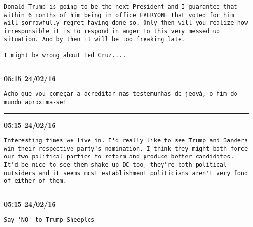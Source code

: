 \begin{adjustwidth}{0cm}{0cm}
\begin{lstlisting}[breaklines, breakatwhitespace, basicstyle=\small, frame=leftline]
Donald Trump is going to be the next President and I guarantee that within 6 months of him being in office EVERYONE that voted for him will sorrowfully regret having done so. Only then will you realize how irresponsible it is to respond in anger to this very messed up situation. And by then it will be too freaking late.

I might be wrong about Ted Cruz....
\end{lstlisting}
\end{adjustwidth}

\hrule%

\begin{adjustwidth}{0cm}{0cm}
\footnotesize \textbf{05:15 24/02/16}

\begin{lstlisting}[breaklines, breakatwhitespace, basicstyle=\small, frame=leftline]
Acho que vou começar a acreditar nas testemunhas de jeová, o fim do mundo aproxima-se!
\end{lstlisting}
\end{adjustwidth}

\hrule%

\begin{adjustwidth}{0cm}{0cm}
\footnotesize \textbf{05:15 24/02/16}

\begin{lstlisting}[breaklines, breakatwhitespace, basicstyle=\small, frame=leftline]
Interesting times we live in. I'd really like to see Trump and Sanders win their respective party's nomination. I think they might both force our two political parties to reform and produce better candidates. It'd be nice to see them shake up DC too, they're both political outsiders and it seems most establishment politicians aren't very fond of either of them.
\end{lstlisting}
\end{adjustwidth}

\hrule%

\begin{adjustwidth}{0cm}{0cm}
\footnotesize \textbf{05:15 24/02/16}

\begin{lstlisting}[breaklines, breakatwhitespace, basicstyle=\small, frame=leftline]
Say 'NO' to Trump Sheeples
\end{lstlisting}
\end{adjustwidth}

